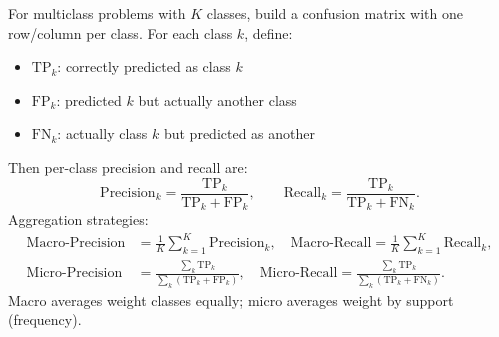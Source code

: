\begin{remark}
    For multiclass problems with $K$ classes, build a confusion matrix with one row/column per class. For each class $k$, define:
    \begin{itemize}
        \item $\mathrm{TP}_k$: correctly predicted as class $k$
        \item $\mathrm{FP}_k$: predicted $k$ but actually another class
        \item $\mathrm{FN}_k$: actually class $k$ but predicted as another
    \end{itemize}
    Then per-class precision and recall are:
    \[
        \text{Precision}_k = \frac{\mathrm{TP}_k}{\mathrm{TP}_k + \mathrm{FP}_k}, \qquad
        \text{Recall}_k = \frac{\mathrm{TP}_k}{\mathrm{TP}_k + \mathrm{FN}_k}.
    \]
    Aggregation strategies:
    \begin{align*}
        \text{Macro-Precision} & = \frac{1}{K} \sum_{k=1}^{K} \text{Precision}_k, \quad
        \text{Macro-Recall}    = \frac{1}{K} \sum_{k=1}^{K} \text{Recall}_k,                                  \\[4pt]
        \text{Micro-Precision} & = \frac{\sum_k \mathrm{TP}_k}{\sum_k (\mathrm{TP}_k + \mathrm{FP}_k)}, \quad
        \text{Micro-Recall}    = \frac{\sum_k \mathrm{TP}_k}{\sum_k (\mathrm{TP}_k + \mathrm{FN}_k)}.
    \end{align*}
    Macro averages weight classes equally; micro averages weight by support (frequency).
\end{remark}

